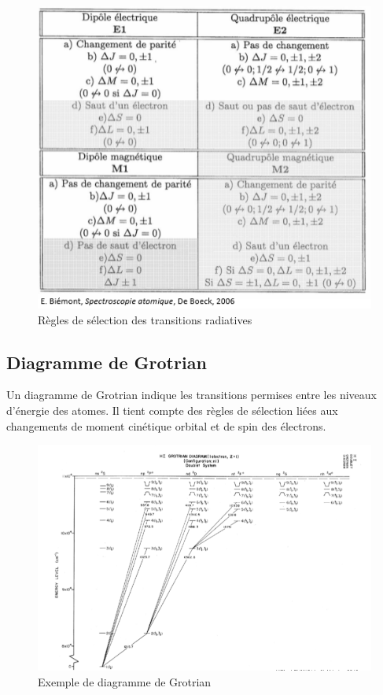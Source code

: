 \begin{figure}[htp]
    \centering
    \includegraphics[scale=0.8]{Images2/regles.PNG}
    \caption{Règles de sélection des transitions radiatives}
    \label{fig:regles_transision_radiatives}
\end{figure}

\subsection{Diagramme de Grotrian}

Un diagramme de Grotrian indique les transitions permises entre les niveaux d'énergie des atomes. Il tient compte des règles de sélection liées aux changements de moment cinétique orbital et de spin des électrons.

\begin{figure}[htp]
    \centering
    \includegraphics[scale=0.5]{Images2/grotrian.PNG}
    \caption{Exemple de diagramme de Grotrian}
    \label{fig:grotrian}
\end{figure}





